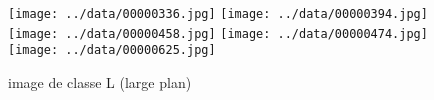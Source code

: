 \documentclass{book}
\begin{document}
\begin{figure}[H]
\begin{center}
\texttt{[image: ../data/00000336.jpg]}
\texttt{[image: ../data/00000394.jpg]}
\texttt{[image: ../data/00000458.jpg]}
\texttt{[image: ../data/00000474.jpg]}
\texttt{[image: ../data/00000625.jpg]}
\end{center}
\caption{image de classe L (large plan)}
\label{classeL}
\end{figure}

\backmatter

\listoftables

\listoffigures
\end{document}
